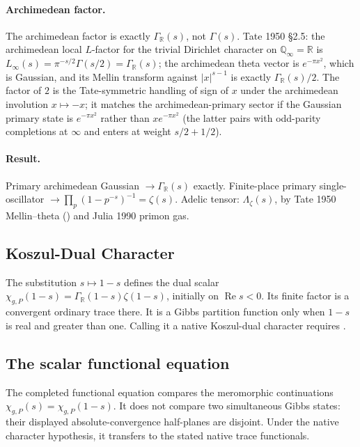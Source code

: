 \paragraph{Archimedean factor.} The archimedean factor is exactly
\(\Gamma_{\mathbb{R}}(s)\), not \(\Gamma(s)\). Tate 1950 \S2.5:
the archimedean local \(L\)-factor for the trivial Dirichlet character
on \(\mathbb{Q}_{\infty}=\mathbb{R}\) is
\(L_{\infty}(s)=\pi^{-s/2}\Gamma(s/2)=\Gamma_{\mathbb{R}}(s)\);
the archimedean theta vector is \(e^{-\pi x^{2}}\), which is
Gaussian, and its Mellin transform against \(|x|^{s-1}\) is exactly
\(\Gamma_{\mathbb{R}}(s)/2\). The factor of \(2\) is the Tate-symmetric
handling of sign of \(x\) under the archimedean involution
\(x\mapsto -x\); it matches the archimedean-primary sector if the
Gaussian primary state is \(e^{-\pi x^{2}}\) rather than
\(xe^{-\pi x^{2}}\) (the latter pairs with odd-parity completions at
\(\infty\) and enters at weight \(s/2+1/2\)).

\paragraph{Result.} Primary archimedean Gaussian
\(\to\Gamma_{\mathbb{R}}(s)\) exactly. Finite-place primary
single-oscillator \(\to\prod_{p}(1-p^{-s})^{-1}=\zeta(s)\). Adelic
tensor: \(\Lambda_{\zeta}(s)\), by Tate 1950 Mellin--theta
() and Julia 1990 primon gas.

\subsection{Koszul-Dual Character}
\label{v4-arith:prim-zeta:att-3-koszul-dual}

The substitution \(s\mapsto1-s\) defines the dual scalar
\(\chi_{g,P}(1-s)=\Gamma_{\mathbb R}(1-s)\zeta(1-s)\), initially on
\(\operatorname{Re}s<0\). Its finite factor is a convergent ordinary
trace there. It is a Gibbs partition function only when \(1-s\) is
real and greater than one. Calling it a native Koszul-dual character
requires .

\subsection{The scalar functional equation}
\label{v4-arith:prim-zeta:att-4-match}
The completed functional equation compares the meromorphic continuations
\(\chi_{g,P}(s)=\chi_{g,P}(1-s)\). It does not compare two simultaneous
Gibbs states: their displayed absolute-convergence half-planes are
disjoint. Under the native character hypothesis, it transfers to the
stated native trace functionals.

